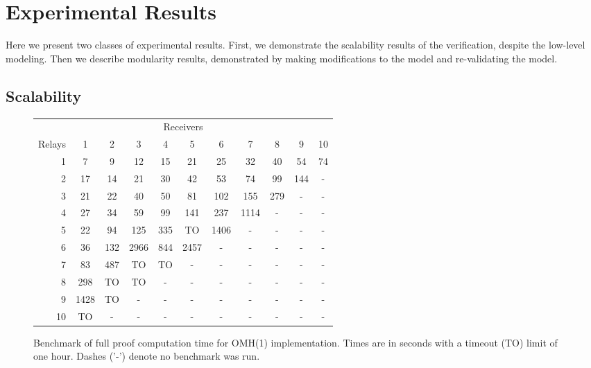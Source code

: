 \documentclass{llncs/llncs}
\begin{document}
\section{Experimental Results}\label{sec:experimental}

Here we present two classes of experimental results. First, we demonstrate the scalability results of the verification, despite the low-level modeling. Then we describe modularity results, demonstrated by making modifications to the model and re-validating the model.

\subsection{Scalability}

\begin{figure}
  \centering
  \begin{tabular}{r||c|c|c|c|c|c|c|c|c|c|}
      \multicolumn{11}{c}{Receivers} \\
      \cline{2-11}
   Relays &   1  &  2  &   3  &  4  &   5  &  6   &  7   &  8  &  9  &  10 \\
      \hline \hline
      1   & 7    & 9   & 12   & 15  & 21   & 25   & 32   & 40  & 54  & 74  \\
      \hline
      2   & 17   & 14  & 21   & 30  & 42   & 53   & 74   & 99  & 144 & -   \\
      \hline
      3   & 21   & 22  & 40   & 50  & 81   & 102  & 155  & 279 & -   & -   \\
      \hline
      4   & 27   & 34  & 59   & 99  & 141  & 237  & 1114 & -   & -   & -   \\
      \hline
      5   & 22   & 94  & 125  & 335 & TO   & 1406 & -    & -   & -   & -   \\
      \hline
      6   & 36   & 132 & 2966 & 844 & 2457 & -    & -    & -   & -   & -   \\
      \hline
      7   & 83   & 487 & TO   & TO  & -    & -    & -    & -   & -   & -   \\
      \hline
      8   & 298  & TO  & TO   & -   & -    & -    & -    & -   & -   & -   \\
      \hline
      9   & 1428 & TO  & -    & -   & -    & -    & -    & -   & -   & -   \\
      \hline
     10   & TO   & -   & -    & -   & -    & -    & -    & -   & -   & -   \\
      \hline
  \end{tabular}
  \label{fig:benchmark}
  \caption{Benchmark of full proof computation time for OMH(1) implementation. Times are in seconds with a timeout (TO) limit of one hour. Dashes ('-') denote no benchmark was run.}
\end{figure}
\end{document}
